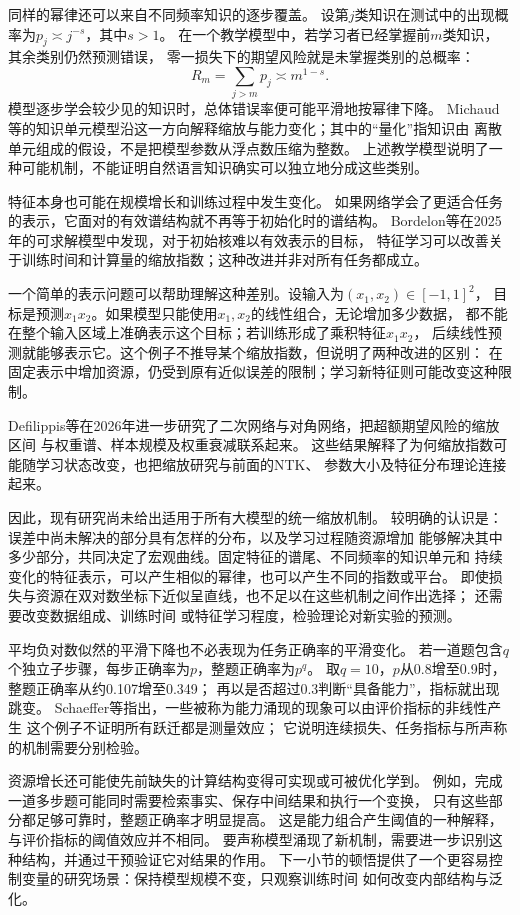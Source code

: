 同样的幂律还可以来自不同频率知识的逐步覆盖。
设第$j$类知识在测试中的出现概率为$p_j\asymp j^{-s}$，其中$s>1$。
在一个教学模型中，若学习者已经掌握前$m$类知识，其余类别仍然预测错误，
零一损失下的期望风险就是未掌握类别的总概率：
\[
 R_m=\sum_{j>m}p_j\asymp m^{1-s}.
\]
模型逐步学会较少见的知识时，总体错误率便可能平滑地按幂律下降。
Michaud等的知识单元模型沿这一方向解释缩放与能力变化；其中的“量化”指知识由
离散单元组成的假设，不是把模型参数从浮点数压缩为整数。
上述教学模型说明了一种可能机制，不能证明自然语言知识确实可以独立地分成这些类别。

特征本身也可能在规模增长和训练过程中发生变化。
如果网络学会了更适合任务的表示，它面对的有效谱结构就不再等于初始化时的谱结构。
Bordelon等在2025年的可求解模型中发现，对于初始核难以有效表示的目标，
特征学习可以改善关于训练时间和计算量的缩放指数；这种改进并非对所有任务都成立。

一个简单的表示问题可以帮助理解这种差别。设输入为$(x_1,x_2)\in[-1,1]^2$，
目标是预测$x_1x_2$。如果模型只能使用$x_1,x_2$的线性组合，无论增加多少数据，
都不能在整个输入区域上准确表示这个目标；若训练形成了乘积特征$x_1x_2$，
后续线性预测就能够表示它。这个例子不推导某个缩放指数，但说明了两种改进的区别：
在固定表示中增加资源，仍受到原有近似误差的限制；学习新特征则可能改变这种限制。

Defilippis等在2026年进一步研究了二次网络与对角网络，把超额期望风险的缩放区间
与权重谱、样本规模及权重衰减联系起来。
这些结果解释了为何缩放指数可能随学习状态改变，也把缩放研究与前面的NTK、
参数大小及特征分布理论连接起来。

因此，现有研究尚未给出适用于所有大模型的统一缩放机制。
较明确的认识是：误差中尚未解决的部分具有怎样的分布，以及学习过程随资源增加
能够解决其中多少部分，共同决定了宏观曲线。固定特征的谱尾、不同频率的知识单元和
持续变化的特征表示，可以产生相似的幂律，也可以产生不同的指数或平台。
即使损失与资源在双对数坐标下近似呈直线，也不足以在这些机制之间作出选择；
还需要改变数据组成、训练时间
或特征学习程度，检验理论对新实验的预测。

平均负对数似然的平滑下降也不必表现为任务正确率的平滑变化。
若一道题包含$q$个独立子步骤，每步正确率为$p$，整题正确率为$p^q$。
取$q=10$，$p$从0.8增至0.9时，整题正确率从约0.107增至0.349；
再以是否超过0.3判断“具备能力”，指标就出现跳变。
Schaeffer等指出，一些被称为能力涌现的现象可以由评价指标的非线性产生 这个例子不证明所有跃迁都是测量效应；
它说明连续损失、任务指标与所声称的机制需要分别检验。


资源增长还可能使先前缺失的计算结构变得可实现或可被优化学到。
例如，完成一道多步题可能同时需要检索事实、保存中间结果和执行一个变换，
只有这些部分都足够可靠时，整题正确率才明显提高。
这是能力组合产生阈值的一种解释，与评价指标的阈值效应并不相同。
要声称模型涌现了新机制，需要进一步识别这种结构，并通过干预验证它对结果的作用。
下一小节的顿悟提供了一个更容易控制变量的研究场景：保持模型规模不变，只观察训练时间
如何改变内部结构与泛化。


